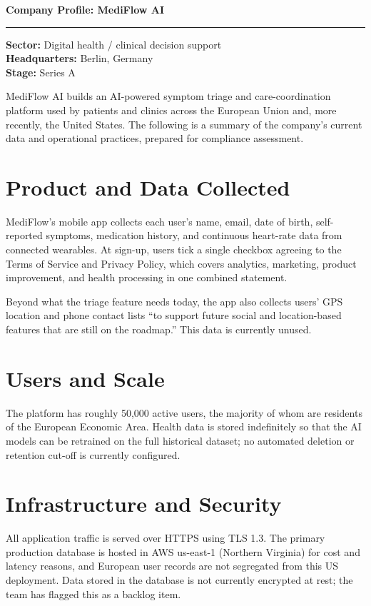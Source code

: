 \documentclass[11pt]{article}
\begin{document}
\begin{center}
  {\LARGE\bfseries Company Profile: MediFlow AI}\\[0.6em]
  \rule{\textwidth}{0.4pt}
\end{center}

\noindent\textbf{Sector:} Digital health / clinical decision support\\
\textbf{Headquarters:} Berlin, Germany\\
\textbf{Stage:} Series A

\medskip
MediFlow AI builds an AI-powered symptom triage and care-coordination platform used by
patients and clinics across the European Union and, more recently, the United States. The
following is a summary of the company's current data and operational practices, prepared
for compliance assessment.

\section{Product and Data Collected}
MediFlow's mobile app collects each user's name, email, date of birth, self-reported
symptoms, medication history, and continuous heart-rate data from connected wearables. At
sign-up, users tick a single checkbox agreeing to the Terms of Service and Privacy Policy,
which covers analytics, marketing, product improvement, and health processing in one
combined statement.

Beyond what the triage feature needs today, the app also collects users' GPS location and
phone contact lists ``to support future social and location-based features that are still
on the roadmap.'' This data is currently unused.

\section{Users and Scale}
The platform has roughly 50,000 active users, the majority of whom are residents of the
European Economic Area. Health data is stored indefinitely so that the AI models can be
retrained on the full historical dataset; no automated deletion or retention cut-off is
currently configured.

\section{Infrastructure and Security}
All application traffic is served over HTTPS using TLS 1.3. The primary production database
is hosted in AWS us-east-1 (Northern Virginia) for cost and latency reasons, and European
user records are not segregated from this US deployment. Data stored in the database is not
currently encrypted at rest; the team has flagged this as a backlog item.
\end{document}

